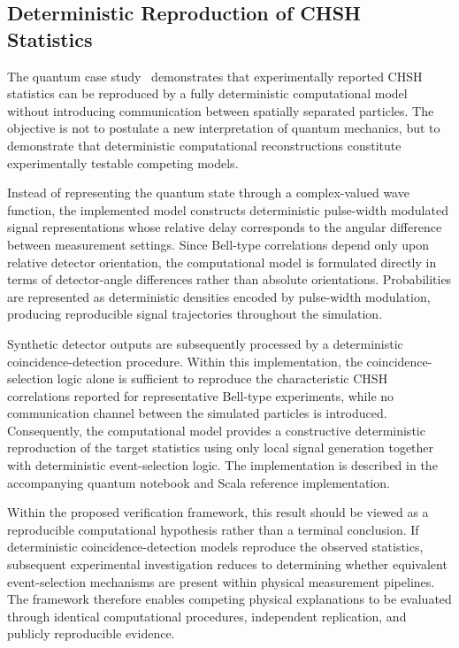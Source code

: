 \documentclass[11pt]{article}
\begin{document}

\subsection{Deterministic Reproduction of CHSH Statistics}

The quantum case study~\cite{doomsdayBell2026, doomsdayQuantum2026} demonstrates that experimentally reported
CHSH statistics can be reproduced by a fully deterministic
computational model without introducing communication between
spatially separated particles.
The objective is not to postulate a new interpretation of quantum
mechanics, but to demonstrate that deterministic computational
reconstructions constitute experimentally testable competing models.

Instead of representing the quantum state through a complex-valued
wave function, the implemented model constructs deterministic
pulse-width modulated signal representations whose relative delay
corresponds to the angular difference between measurement settings.
Since Bell-type correlations depend only upon relative detector
orientation, the computational model is formulated directly in terms
of detector-angle differences rather than absolute orientations.
Probabilities are represented as deterministic densities encoded by
pulse-width modulation, producing reproducible signal trajectories
throughout the simulation.

Synthetic detector outputs are subsequently processed by a deterministic
coincidence-detection procedure.
Within this implementation, the coincidence-selection logic alone is
sufficient to reproduce the characteristic CHSH correlations reported
for representative Bell-type experiments, while no communication
channel between the simulated particles is introduced.
Consequently, the computational model provides a constructive
deterministic reproduction of the target statistics using only local
signal generation together with deterministic event-selection logic.
The implementation is described in the accompanying quantum notebook
and Scala reference implementation.

Within the proposed verification framework, this result should be
viewed as a reproducible computational hypothesis rather than a
terminal conclusion.
If deterministic coincidence-detection models reproduce the observed
statistics, subsequent experimental investigation reduces to
determining whether equivalent event-selection mechanisms are present
within physical measurement pipelines.
The framework therefore enables competing physical explanations to be
evaluated through identical computational procedures, independent
replication, and publicly reproducible evidence.
\end{document}
